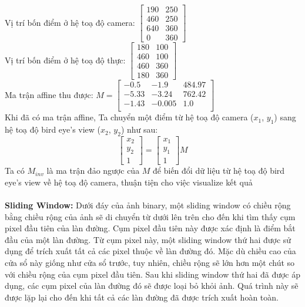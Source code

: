 \noindent Vị trí bốn điểm ở hệ toạ độ camera: $\begin{bmatrix}190 & 250\\460 & 250\\640 & 360\\0 & 360\end{bmatrix}$\\
Vị trí bốn điểm ở hệ toạ độ thực: $\begin{bmatrix}180 & 100\\460 & 100\\460 & 360\\180 & 360\end{bmatrix}$\\
Ma trận affine thu được: $M = \begin{bmatrix}-0.5 & -1.9 & 484.97\\-5.33 & -3.24 & 762.42\\-1.43 & -0.005 & 1.0\\\end{bmatrix}$\\
Khi đã có ma trận affine, Ta chuyển một điểm từ hệ toạ độ camera ($x_1$, $y_1$) sang hệ toạ độ
bird eye's view ($x_2$, $y_2$) như sau:
\begin{equation}
    \begin{bmatrix}x_2\\y_2\\1\end{bmatrix} = \begin{bmatrix}x_1\\y_1\\1\end{bmatrix}M
\end{equation}
Ta có $M_{inv}$ là ma trận đảo ngược của $M$ để biến đổi dữ liệu từ hệ toạ độ bird eye's view về hệ toạ độ camera, thuận tiện cho việc visualize kết quả \\\\
\textbf{Sliding Window:}
Dưới đáy của ảnh binary, một sliding window có chiều rộng bằng chiều rộng của ảnh sẽ di chuyển từ dưới lên trên cho đến khi tìm thấy cụm pixel đầu tiên của làn đường. Cụm pixel đầu tiên này được xác định là điểm bắt đầu của một làn đường. Từ cụm pixel này, một sliding window thứ hai được sử dụng để trích xuất tất cả các pixel thuộc về làn đường đó. Mặc dù chiều cao của cửa sổ này giống như cửa sổ trước, tuy nhiên, chiều rộng sẽ lớn hơn một chút so với chiều rộng của cụm pixel đầu tiên. Sau khi sliding window thứ hai đã được áp dụng, các cụm pixel của làn đường đó sẽ được loại bỏ khỏi ảnh. Quá trình này sẽ được lặp lại cho đến khi tất cả các làn đường đã được trích xuất hoàn toàn.\\
